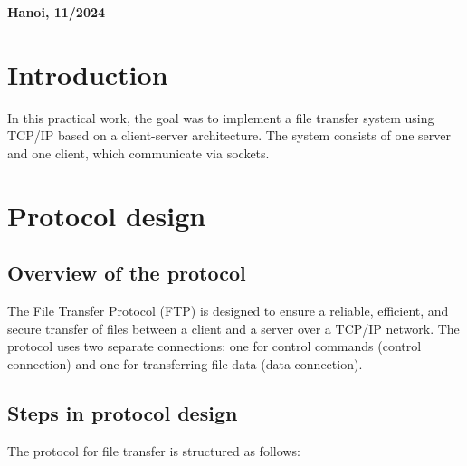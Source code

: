 \documentclass{article}
\begin{document}
\begin{center}
    \vspace{48pt}
    \fontsize{14pt}{0pt}\selectfont{} \textbf{Hanoi, 11/2024}
\end{center}

\thispagestyle{empty}
    \newpage

\thispagestyle{empty}
    \newpage

\tableofcontents 
    \thispagestyle{empty}
        \newpage
            \thispagestyle{empty}
                \newpage

\section{Introduction}
In this practical work, the goal was to implement a file transfer system using TCP/IP based on a client-server architecture. The system consists of one server and one client, which communicate via sockets.

\section{Protocol design}
\subsection{Overview of the protocol}
The File Transfer Protocol (FTP) is designed to ensure a reliable, efficient, and secure transfer of files between a client and a server over a TCP/IP network. The protocol uses two separate connections: one for control commands (control connection) and one for transferring file data (data connection).

\subsection{Steps in protocol design}
The protocol for file transfer is structured as follows:
\end{document}
